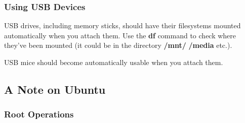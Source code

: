 \documentclass[11pt]{article}
\begin{document}
% 
% 
% 
% 
% 
% 
% 
% 
% 
% 
% 

\subsubsection{Using USB Devices}

USB drives, including memory sticks, should have their filesystems
mounted automatically when you attach them.  Use the {\bf df} command to
check where they've been mounted (it could be in the directory {\bf
/mnt/} {\bf /media} etc.). 

USB mice should become automatically usable when you attach them.

\subsection{A Note on Ubuntu}

\subsubsection{Root Operations}
\label{sudo}
\end{document}
